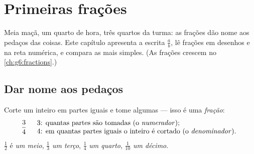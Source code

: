 \chapter{Primeiras frações}\label{ch:g4:fractions}

Meia maçã, um quarto de hora, três quartos da turma: as frações dão
nome aos pedaços das coisas. Este capítulo apresenta a escrita
$\frac{a}{b}$, lê frações em desenhos e na reta numérica, e compara
as mais simples. (As frações crescem no \cref{ch:g6:fractions}.)

\section{Dar nome aos pedaços}

\begin{definition}[Fração]\label{def:g4:fractions:def}
Corte um inteiro em partes iguais e tome algumas --- isso é uma
\emph{fração}:
\[
\frac{3}{4}
\quad
\begin{array}{l}
3 \text{: quantas partes são tomadas (o \emph{numerador}\index{numerador});}\\
4 \text{: em quantas partes iguais o inteiro é cortado (o
\emph{denominador}\index{denominador}).}
\end{array}
\]
$\frac12$ é \emph{um meio}, $\frac13$ \emph{um terço}, $\frac14$
\emph{um quarto}, $\frac{1}{10}$ \emph{um décimo}.
\end{definition}

